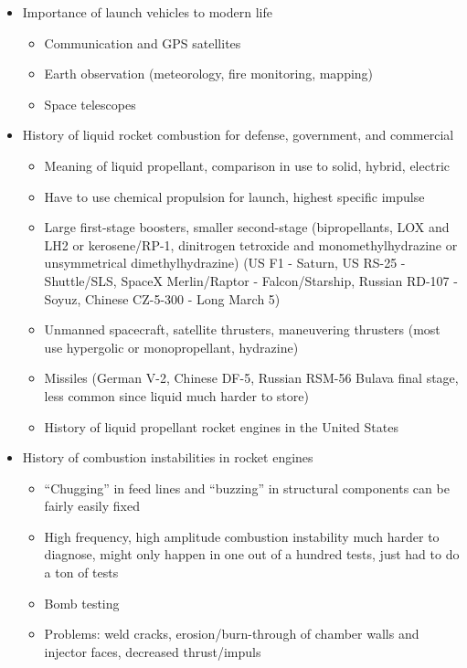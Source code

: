 \begin{itemize}
    \item Importance of launch vehicles to modern life
    \begin{itemize}
        \item Communication and GPS satellites
        \item Earth observation (meteorology, fire monitoring, mapping)
        \item Space telescopes
    \end{itemize}
    \item History of liquid rocket combustion for defense, government, and commercial
    \begin{itemize}
        \item Meaning of liquid propellant, comparison in use to solid, hybrid, electric
        \item Have to use chemical propulsion for launch, highest specific impulse
        \item Large first-stage boosters, smaller second-stage (bipropellants, LOX and LH2 or kerosene/RP-1, dinitrogen tetroxide and monomethylhydrazine or unsymmetrical dimethylhydrazine) (US F1 - Saturn, US RS-25 - Shuttle/SLS, SpaceX Merlin/Raptor - Falcon/Starship, Russian RD-107 - Soyuz, Chinese CZ-5-300 - Long March 5)
        \item Unmanned spacecraft, satellite thrusters, maneuvering thrusters (most use hypergolic or monopropellant, hydrazine)
        \item Missiles (German V-2, Chinese DF-5, Russian RSM-56 Bulava final stage, less common since liquid much harder to store)
        \item History of liquid propellant rocket engines in the United States~\cite{Sutton2003}
    \end{itemize}
    \item History of combustion instabilities in rocket engines
    \begin{itemize}
        \item ``Chugging'' in feed lines and ``buzzing'' in structural components can be fairly easily fixed
        \item High frequency, high amplitude combustion instability much harder to diagnose, might only happen in one out of a hundred tests, just had to do a ton of tests
        \item Bomb testing
        \item Problems: weld cracks, erosion/burn-through of chamber walls and injector faces, decreased thrust/impuls

\end{itemize}
\end{itemize}
